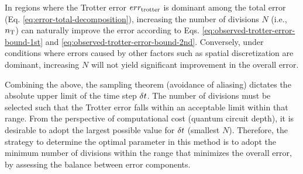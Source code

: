 \documentclass[aip-draft.tex]{subfiles}
\begin{document}
In regions where the Trotter error $err_{\mathrm{trotter}}$ is dominant among the total
error (Eq. \eqref{eq:error-total-decomposition}), increasing the number of
divisions $N$ (i.e., $n_{\mathrm{T}}$) can naturally improve the error according to Eqs.
\eqref{eq:observed-trotter-error-bound-1st} and
\eqref{eq:observed-trotter-error-bound-2nd}. Conversely, under conditions where
errors caused by other factors such as spatial discretization are dominant,
increasing $N$ will not yield significant improvement in the overall error.

Combining the above, the sampling theorem (avoidance of aliasing) dictates the
absolute upper limit of the time step $\delta t$. The number of divisions must be
selected such that the Trotter error falls within an acceptable limit within that
range. From the perspective of computational cost (quantum circuit depth), it is
desirable to adopt the largest possible value for $\delta t$ (smallest $N$).
Therefore, the strategy to determine the optimal parameter in this method is to
adopt the minimum number of divisions within the range that minimizes the
overall error, by assessing the balance between error components.

\ifSubfilesClassLoaded{}{}
\end{document}
